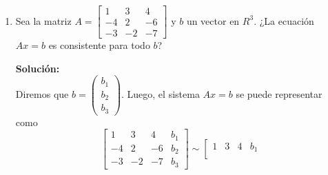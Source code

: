 \documentclass[12pt]{article}
\newenvironment{solucion}
{\begin{mdframed}[backgroundcolor=black!10]
		{\bf Solución:}\\
	}
	{
	\end{mdframed}
}
\newenvironment{preguntas}
{\begin{enumerate}\itemsep12pt
	}
	{
	\end{enumerate}
}
\newcommand{\ra}{\rightarrow}
\newcommand{\widesim}[2][1.5]{
	\mathrel{\overset{#2}{\scalebox{#1}[1]{$\sim$}}}
}
\newcommand{\wsim}{\widesim{}}
\begin{document}
\begin{preguntas}
\begin{solucion}
\begin{enumerate}[a)]
\item $
			\begin{bmatrix}
			1 & h & 4\\
			3 & 6 & 8
			\end{bmatrix}
			\wsim
			\begin{bmatrix}
			1 & h & 4\\
			0 & 6-3h & -4
			\end{bmatrix}
			$\\\\
		    Para que el sistema sea consistente, $6 - 3h$ no puede ser $0$, es decir
			$$6 - 3h \neq 0 \ra h \neq 2$$
\item $
			\begin{bmatrix}
			-4 & 12 & h\\
			2 & -6 & -3
			\end{bmatrix}
			\wsim
			\begin{bmatrix}
			-4 & 12 & h\\
			0 & 0 & -3 - \frac{h}{2}
			\end{bmatrix}
			$\\\\
			En este caso, el último coeficiente debe ser 0, para que el sistema sea consistente,
			$$-3 - \dfrac{h}{2} = 0 \ra 3 = -\dfrac{h}{2} \ra 6 = -h \ra h = -6$$
\end{enumerate}
\end{solucion}
\item Sea la matriz $A=
	\begin{bmatrix}
	1 & 3 & 4\\
	-4 & 2 & -6\\
	-3 & -2 & -7
	\end{bmatrix}
	$ y $b$ un vector en $R^3$. ¿La ecuación $Ax=b$ es consistente para todo $b$?
\begin{solucion}
Diremos que $b = \begin{pmatrix}
	b_1 \\ b_2 \\ b_3
	\end{pmatrix}$. Luego, el sistema $Ax = b$ se puede representar como
	$$\left[
	\begin{array}{ccc|c}
	1 & 3 & 4 &b_1\\
	-4 & 2 & -6 & b_2\\
	-3 & -2 & -7 & b_3
	\end{array}
	\right] \sim \left[
	\begin{array}{ccc|c}
	1 & 3 & 4 &b_1\\

\end{array}$$
\end{solucion}
\end{preguntas}
\end{document}
